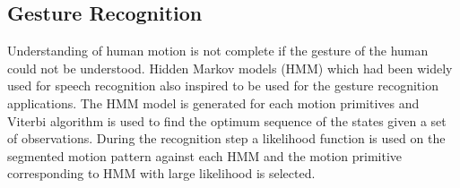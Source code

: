 \subsection{Gesture Recognition}
Understanding of human motion is not complete if the gesture of the human could not be understood. Hidden Markov models (HMM) which had been widely used for speech recognition \cite{rabiner1989tutorial} also inspired to be used for the gesture recognition applications. The HMM model is generated for each motion primitives and Viterbi algorithm is used to find the optimum sequence of the states given a set of observations. During the recognition step a likelihood function is used on the segmented motion pattern against each HMM and the motion primitive corresponding to HMM with large likelihood is selected.

